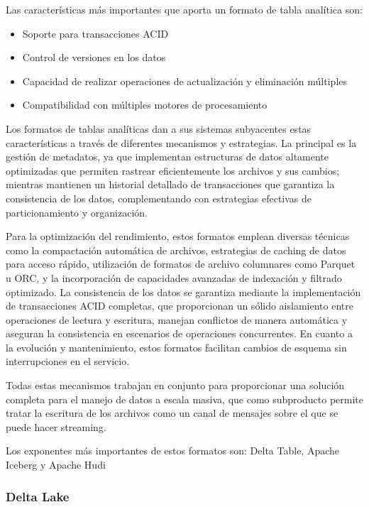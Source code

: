 Las características más importantes que aporta un formato de tabla analítica son:
\begin{itemize}
    \item Soporte para transacciones ACID
    \item Control de versiones en los datos
    \item Capacidad de realizar operaciones de actualización y eliminación múltiples
    \item Compatibilidad con múltiples motores de procesamiento
\end{itemize}

Los formatos de tablas analíticas dan a sus sistemas subyacentes estas características a través de diferentes mecanismos y estrategias. 
La principal es la gestión de metadatos, ya que implementan estructuras de datos altamente optimizadas que permiten rastrear 
eficientemente los archivos y sus cambios; mientras mantienen un historial detallado de transacciones que garantiza la consistencia de los datos, 
complementando con estrategias efectivas de particionamiento y organización. 

Para la optimización del rendimiento, estos formatos emplean diversas técnicas como la compactación automática de archivos, 
estrategias de caching de datos para acceso rápido, utilización de formatos de archivo columnares como Parquet u ORC, 
y la incorporación de capacidades avanzadas de indexación y filtrado optimizado. 
La consistencia de los datos se garantiza mediante la implementación de transacciones ACID completas, 
que proporcionan un sólido aislamiento entre operaciones de lectura y escritura, manejan conflictos de manera automática 
y aseguran la consistencia en escenarios de operaciones concurrentes. 
En cuanto a la evolución y mantenimiento, estos formatos facilitan cambios de esquema sin interrupciones en el servicio. 

Todas estas mecanismos trabajan en conjunto para proporcionar una solución completa para el manejo de datos a escala masiva,
que como subproducto permite tratar la escritura de los archivos como un canal de mensajes sobre el que se puede hacer streaming.

Los exponentes más importantes de estos formatos son: Delta Table, Apache Iceberg y Apache Hudi


\subsubsection{Delta Lake}

